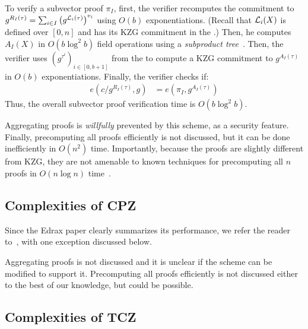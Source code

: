 To verify a subvector proof $\pi_I$, first, the verifier recomputes the commitment to $g^{R_I(\tau)}=\sum_{i\in I} \left(g^{\mathcal{L}_i(\tau)}\right)^{v_i}$ using $O(b)$ exponentiations.
(Recall that $\mathcal{L}_i(X)$ is defined over $[0,n]$ and has its KZG commitment in the \vrk.)
Then, he computes $A_I(X)$ in $O(b\log^2{b})$ field operations using a \textit{subproduct tree}~\cite{vG13ModernCh10}.
Then, the verifier uses $(g^{\tau^i})_{i\in [0,b+1]}$ from the \vrk to compute a KZG commitment to $g^{A_I(\tau)}$ in $O(b)$ exponentiations.
Finally, the verifier checks if:
\begin{align}
e(c/g^{R_I(\tau)},g) &= e(\pi_I, g^{A_I(\tau)})
\end{align}
Thus, the overall subvector proof verification time is $O(b\log^2{b})$.

Aggregating proofs is \textit{willfully} prevented by this scheme, as a security feature.
Finally, precomputing all proofs efficiently is not discussed, but it can be done inefficiently in $O(n^2)$ time.
Importantly, because the proofs are slightly different from KZG, they are not amenable to known techniques for precomputing all $n$ proofs in $O(n\log{n})$ time~\cite{FK20}.

\subsection{Complexities of CPZ~\cite{CPZ18}}
\label{s:complexity:cpz}

Since the Edrax paper clearly summarizes its performance, we refer the reader to~\cite[Table 1]{CPZ18}, with one exception discussed below.

Aggregating proofs is not discussed and it is unclear if the scheme can be modified to support it.
Precomputing all proofs efficiently is not discussed either to the best of our knowledge, but could be possible.

\subsection{Complexities of TCZ~\cite{TCZ+20,Tomescu20}}
\label{s:complexity-tcz}

